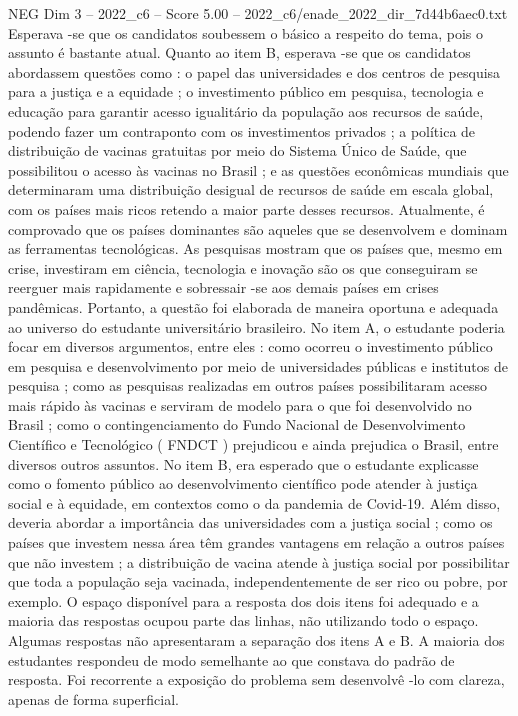 \begin{textsample}{NEG Dim 3 – 2022\_c6 – Score 5.00 – 2022\_c6/enade\_2022\_dir\_7d44b6aec0.txt}
Esperava -se que os candidatos soubessem o básico a respeito do tema, pois o assunto é bastante atual.
Quanto ao item B, esperava -se que os candidatos abordassem questões como : o papel das universidades e dos centros de pesquisa para a justiça e a equidade ; o investimento público em pesquisa, tecnologia e educação para garantir acesso igualitário da população aos recursos de saúde, podendo fazer um contraponto com os investimentos privados ; a política de distribuição de vacinas gratuitas por meio do Sistema Único de Saúde, que possibilitou o acesso às vacinas no Brasil ; e as questões econômicas mundiais que determinaram uma distribuição desigual de recursos de saúde em escala global, com os países mais ricos retendo a maior parte desses recursos.
Atualmente, é comprovado que os países dominantes são aqueles que se desenvolvem e dominam as ferramentas tecnológicas.
As pesquisas mostram que os países que, mesmo em crise, investiram em ciência, tecnologia e inovação são os que conseguiram se reerguer mais rapidamente e sobressair -se aos demais países em crises pandêmicas.
Portanto, a questão foi elaborada de maneira oportuna e adequada ao universo do estudante universitário brasileiro.
No item A, o estudante poderia focar em diversos argumentos, entre eles : como ocorreu o investimento público em pesquisa e desenvolvimento por meio de universidades públicas e institutos de pesquisa ; como as pesquisas realizadas em outros países possibilitaram acesso mais rápido às vacinas e serviram de modelo para o que foi desenvolvido no Brasil ; como o contingenciamento do Fundo Nacional de Desenvolvimento Científico e Tecnológico ( FNDCT ) prejudicou e ainda prejudica o Brasil, entre diversos outros assuntos.
No item B, era esperado que o estudante explicasse como o fomento público ao desenvolvimento científico pode atender à justiça social e à equidade, em contextos como o da pandemia de Covid-19.
Além disso, deveria abordar a importância das universidades com a justiça social ; como os países que investem nessa área têm grandes vantagens em relação a outros países que não investem ; a distribuição de vacina atende à justiça social por possibilitar que toda a população seja vacinada, independentemente de ser rico ou pobre, por exemplo.
O espaço disponível para a resposta dos dois itens foi adequado e a maioria das respostas ocupou parte das linhas, não utilizando todo o espaço.
Algumas respostas não apresentaram a separação dos itens A e B.
A maioria dos estudantes respondeu de modo semelhante ao que constava do padrão de resposta.
Foi recorrente a exposição do problema sem desenvolvê -lo com clareza, apenas de forma superficial.

\end{textsample}
